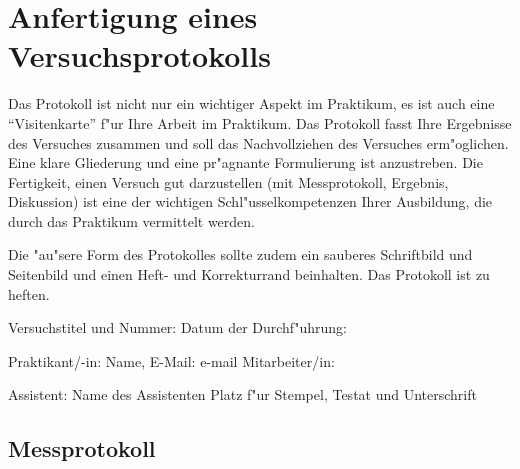 \chapter{Anfertigung eines Versuchsprotokolls}
\label{c:protokoll}

Das Protokoll ist nicht nur ein wichtiger Aspekt im Praktikum,
es ist auch eine "`Visitenkarte"' f"ur Ihre Arbeit im Praktikum. Das
Protokoll fasst Ihre Ergebnisse des Versuches zusammen und soll das
Nachvollziehen des Versuches erm"oglichen. Eine klare Gliederung und
eine pr"agnante Formulierung ist anzustreben. Die Fertigkeit, einen Versuch
gut darzustellen (mit Messprotokoll, Ergebnis, Diskussion) ist eine der wichtigen
Schl"usselkompetenzen Ihrer Ausbildung, die durch das Praktikum vermittelt werden.

Die "au"sere Form des Protokolles sollte zudem ein sauberes
Schriftbild und Seitenbild und einen Heft- und Korrekturrand
beinhalten. Das Protokoll ist zu heften.


\vspace{1cm}


\noindent Versuchstitel und Nummer:  \hfill  Datum der
Durchf"uhrung:

\noindent Praktikant/-in: Name, E-Mail: e-mail
\hfill Mitarbeiter/in:

\noindent Assistent: Name des Assistenten  \hfill Platz f"ur
Stempel, Testat und Unterschrift





\section{Messprotokoll}

